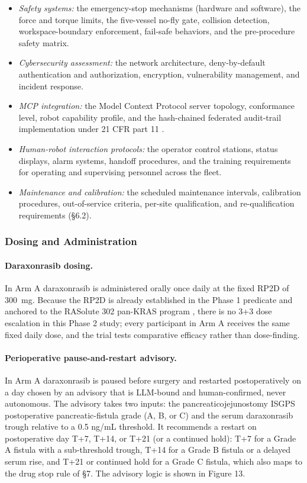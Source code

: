 \begin{itemize}[leftmargin=1.4em,itemsep=1pt,topsep=2pt]
rehearsal and intra-operative guidance.
\item[(vii)] \textit{Safety systems:} the emergency-stop mechanisms (hardware and
software), the force and torque limits, the five-vessel no-fly gate, collision
detection, workspace-boundary enforcement, fail-safe behaviors, and the
pre-procedure safety matrix.
\item[(viii)] \textit{Cybersecurity assessment:} the network architecture,
deny-by-default authentication and authorization, encryption, vulnerability
management, and incident response.
\item[(ix)] \textit{MCP integration:} the Model Context Protocol server topology,
conformance level, robot capability profile, and the hash-chained federated
audit-trail implementation under 21 CFR part 11 \cite{ecfr2026part11}.
\item[(x)] \textit{Human-robot interaction protocols:} the operator control
stations, status displays, alarm systems, handoff procedures, and the training
requirements for operating and supervising personnel across the fleet.
\item[(xi)] \textit{Maintenance and calibration:} the scheduled maintenance
intervals, calibration procedures, out-of-service criteria, per-site qualification,
and re-qualification requirements (\S6.2).
\end{itemize}

\subsubsection{Dosing and Administration}

\paragraph{Daraxonrasib dosing.}
In Arm A daraxonrasib is administered orally once daily at the fixed RP2D of 300~mg.
Because the RP2D is already established in the Phase 1 predicate and anchored to the
RASolute 302 pan-KRAS program \cite{kawchak2026phase1,rasolute302}, there is no 3+3
dose escalation in this Phase 2 study; every participant in Arm A receives the same
fixed daily dose, and the trial tests comparative efficacy rather than dose-finding.

\paragraph{Perioperative pause-and-restart advisory.}
In Arm A daraxonrasib is paused before surgery and restarted postoperatively on a
day chosen by an advisory that is LLM-bound and human-confirmed, never autonomous.
The advisory takes two inputs: the pancreaticojejunostomy ISGPS postoperative
pancreatic-fistula grade (A, B, or C) \cite{Bassi2017} and the serum daraxonrasib
trough relative to a 0.5 ng/mL threshold. It recommends a restart on postoperative
day T+7, T+14, or T+21 (or a continued hold): T+7 for a Grade A fistula with a
sub-threshold trough, T+14 for a Grade B fistula or a delayed serum rise, and T+21
or continued hold for a Grade C fistula, which also maps to the drug stop rule of
\S7. The advisory logic is shown in Figure 13.


